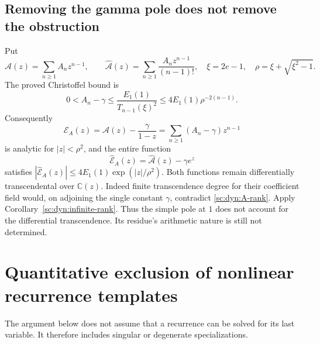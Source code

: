 \documentclass[11pt,a4paper]{article}
\theoremstyle{definition}
\theoremstyle{remark}
\theoremstyle{plain}
\numberwithin{equation}{section}
\begin{document}
\subsection{Removing the gamma pole does not remove the obstruction}
Put
\[
 \mathcal A(z)=\sum_{n\ge1}A_nz^{n-1},\qquad
 \widehat{\mathcal A}(z)=\sum_{n\ge1}\frac{A_nz^{n-1}}{(n-1)!},
 \quad \xi=2e-1,\quad \rho=\xi+\sqrt{\xi^2-1}.
\]
The proved Christoffel bound is
\[
 0<A_n-\gamma\le\frac{E_1(1)}{T_{n-1}(\xi)^2}
                  \le4E_1(1)\rho^{-2(n-1)}.
\]
Consequently
\[
 \mathcal E_A(z)=\mathcal A(z)-\frac{\gamma}{1-z}
                =\sum_{n\ge1}(A_n-\gamma)z^{n-1}
\]
is analytic for $|z|<\rho^2$, and the entire function
\[
 \widehat{\mathcal E}_A(z)=\widehat{\mathcal A}(z)-\gamma e^z
\]
satisfies $|\widehat{\mathcal E}_A(z)|\le
4E_1(1)\exp(|z|/\rho^2)$. Both functions remain differentially
transcendental over $\mathbb C(z)$. Indeed finite transcendence degree
for their coefficient field would, on adjoining the single constant
$\gamma$, contradict \eqref{sc:dyn:A-rank}. Apply
Corollary~\ref{sc:dyn:infinite-rank}. Thus the simple pole at $1$ does not
account for the differential transcendence. Its residue's arithmetic
nature is still not determined.

\section{Quantitative exclusion of nonlinear recurrence templates}
\label{sc:sec:nonlinear-recurrence}

The argument below does not assume that a recurrence can be solved for
its last variable. It therefore includes singular or degenerate
specializations.
\end{document}
